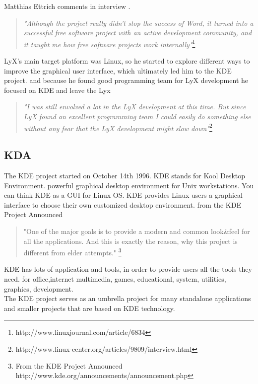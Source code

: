 \documentclass[DIV=calc, paper=a4, fontsize=11pt]{scrartcl}
\begin{document}
Matthias Ettrich comments in interview .
\begin{quote}
\emph{"Although the project really didn't stop the success of Word, it turned into a successful free software project with an active development community, and it taught me how free software projects work internally"}\footnote {http://www.linuxjournal.com/article/6834}
\end{quote}

LyX's main target platform was Linux, so he started to explore different ways to improve the graphical user interface, which ultimately led him to the KDE project. and because he found good programming team for LyX development he  focused on KDE and leave the Lyx
\begin{quote}
\emph{"I was still envolved a lot in the LyX development at this time. But since LyX found an excellent programming team I could easily do something else without any fear that the LyX development might slow down"}\footnote {http://www.linux-center.org/articles/9809/interview.html}
\end{quote}
\subsection{KDA}
The KDE project started on October 14th 1996.
KDE stands for Kool Desktop Environment.
 powerful graphical desktop environment for Unix workstations. You can think KDE as a GUI for Linux OS. KDE provides Linux users a graphical interface to choose their own customized desktop environment.
 from the KDE Project Announced 
\begin{quote} "One of the major goals is to provide a modern and common look\&feel for all the applications. And this is exactly the reason, why this project is different from elder attempts." \footnote {From the KDE Project Announced {http://www.kde.org/announcements/announcement.php}}
\end {quote}
KDE has lots of application and tools, in order to provide users all the tools they need.
for office,internet multimedia, games, educational, system, utilities, graphics, development.\\
The KDE project serves as an umbrella project for many standalone applications and smaller projects that are based on KDE technology.
\end{document}
